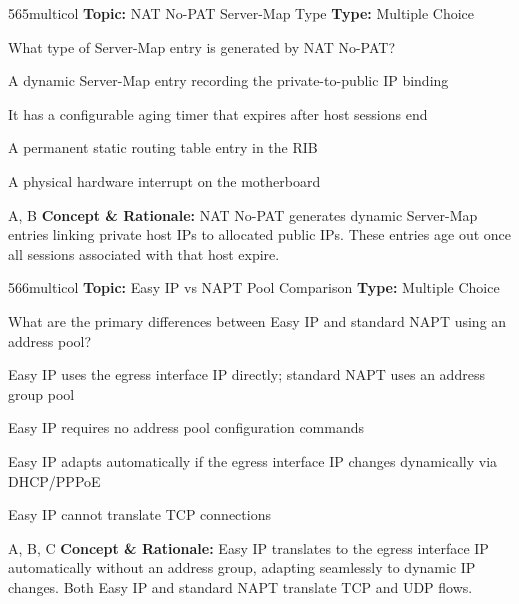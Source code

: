 \begin{qcard}{565}{multicol}
\textcolor{darkslate!75}{\small\textbf{Topic:} NAT No-PAT Server-Map Type \hfill \textbf{Type:} Multiple Choice}\vspace{0.4em}\par
What type of Server-Map entry is generated by NAT No-PAT?
\begin{qoptions}
\item A dynamic Server-Map entry recording the private-to-public IP binding
\item It has a configurable aging timer that expires after host sessions end
\item A permanent static routing table entry in the RIB
\item A physical hardware interrupt on the motherboard
\end{qoptions}
\end{qcard}
\nopagebreak
\begin{explainbox}{A, B}
\textbf{Concept \& Rationale:} NAT No-PAT generates dynamic Server-Map entries linking private host IPs to allocated public IPs. These entries age out once all sessions associated with that host expire.
\end{explainbox}

\begin{qcard}{566}{multicol}
\textcolor{darkslate!75}{\small\textbf{Topic:} Easy IP vs NAPT Pool Comparison \hfill \textbf{Type:} Multiple Choice}\vspace{0.4em}\par
What are the primary differences between Easy IP and standard NAPT using an address pool?
\begin{qoptions}
\item Easy IP uses the egress interface IP directly; standard NAPT uses an address group pool
\item Easy IP requires no address pool configuration commands
\item Easy IP adapts automatically if the egress interface IP changes dynamically via DHCP/PPPoE
\item Easy IP cannot translate TCP connections
\end{qoptions}
\end{qcard}
\nopagebreak
\begin{explainbox}{A, B, C}
\textbf{Concept \& Rationale:} Easy IP translates to the egress interface IP automatically without an address group, adapting seamlessly to dynamic IP changes. Both Easy IP and standard NAPT translate TCP and UDP flows.
\end{explainbox}

